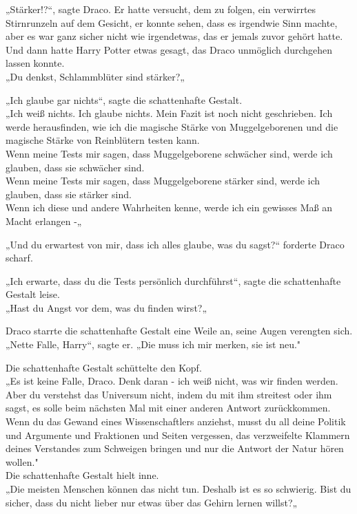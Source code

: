 {„Stärker!?“, sagte Draco. Er hatte versucht, dem zu folgen, ein verwirrtes Stirnrunzeln auf dem Gesicht, er konnte sehen, dass es irgendwie Sinn machte, aber es war ganz sicher nicht wie irgendetwas, das er jemals zuvor gehört hatte.\\ Und dann hatte Harry Potter etwas gesagt, das Draco unmöglich durchgehen lassen konnte.\\ „Du denkst, Schlammblüter sind stärker?„

„Ich glaube gar nichts“, sagte die schattenhafte Gestalt.\\ „Ich weiß nichts. Ich glaube nichts. Mein Fazit ist noch nicht geschrieben. Ich werde herausfinden, wie ich die magische Stärke von Muggelgeborenen und die magische Stärke von Reinblütern testen kann.\\ Wenn meine Tests mir sagen, dass Muggelgeborene schwächer sind, werde ich glauben, dass sie schwächer sind.\\ Wenn meine Tests mir sagen, dass Muggelgeborene stärker sind, werde ich glauben, dass sie stärker sind.\\ Wenn ich diese und andere Wahrheiten kenne, werde ich ein gewisses Maß an Macht erlangen -„

„Und du erwartest von mir, dass ich alles glaube, was du sagst?“ forderte Draco scharf.

„Ich erwarte, dass du die Tests persönlich durchführst“, sagte die schattenhafte Gestalt leise.\\ „Hast du Angst vor dem, was du finden wirst?„

Draco starrte die schattenhafte Gestalt eine Weile an, seine Augen verengten sich.\\ „Nette Falle, Harry“, sagte er. „Die muss ich mir merken, sie ist neu."

Die schattenhafte Gestalt schüttelte den Kopf.\\ „Es ist keine Falle, Draco. Denk daran - ich weiß nicht, was wir finden werden. Aber du verstehst das Universum nicht, indem du mit ihm streitest oder ihm sagst, es solle beim nächsten Mal mit einer anderen Antwort zurückkommen.\\ Wenn du das Gewand eines Wissenschaftlers anziehst, musst du all deine Politik und Argumente und Fraktionen und Seiten vergessen, das verzweifelte Klammern deines Verstandes zum Schweigen bringen und nur die Antwort der Natur hören wollen."\\ Die schattenhafte Gestalt hielt inne.\\ „Die meisten Menschen können das nicht tun. Deshalb ist es so schwierig. Bist du sicher, dass du nicht lieber nur etwas über das Gehirn lernen willst?„

}
